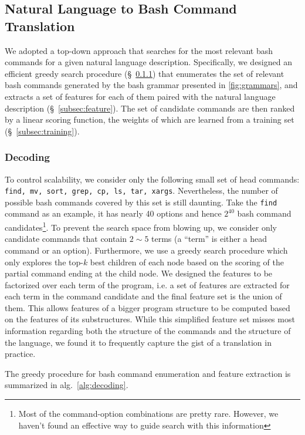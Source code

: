 \subsection{Natural Language to Bash Command Translation}
\label{subsec:parser}

We adopted a top-down approach that searches for the most relevant bash commands for a given natural language description. Specifically, we designed an efficient greedy search procedure (\S~\ref{subsec:decoding}) that enumerates the set of relevant bash commands generated by the bash grammar presented in \autoref{fig:grammars}, and extracts a set of features for each of them paired with the natural language description (\S~\ref{subsec:feature}). The set of candidate commands are then ranked by a linear scoring function, the weights of which are learned from a training set (\S~\ref{subsec:training}).

\subsubsection{Decoding}
\label{subsec:decoding}

To control scalability, we consider only the following small set of head commands: \texttt{find, mv, sort, grep, cp, ls, tar, xargs}. Nevertheless, the number of possible bash commands covered by this set is still daunting. Take the \texttt{find} command as an example, it has nearly 40 options and hence $2^{40}$ bash command candidates\footnote{Most of the command-option combinations are pretty rare. However, we haven't found an effective way to guide search with this information}. To prevent the search space from blowing up, we consider only candidate commands that contain $2\sim 5$ terms (a ``term'' is either a head command or an option). Furthermore, we use a greedy search procedure which only explores the top-$k$ best children of each node based on the scoring of the partial command ending at the child node. We designed the features to be factorized over each term of the program, i.e. a set of features are extracted for each term in the command candidate and the final feature set is the union of them. This allows features of a bigger program structure to be computed based on the features of its substructures. While this simplified feature set misses most information regarding both the structure of the commands and the structure of the language, we found it to frequently capture the gist of a translation in practice.

The greedy procedure for bash command enumeration and feature extraction is summarized in alg.~\ref{alg:decoding}.

